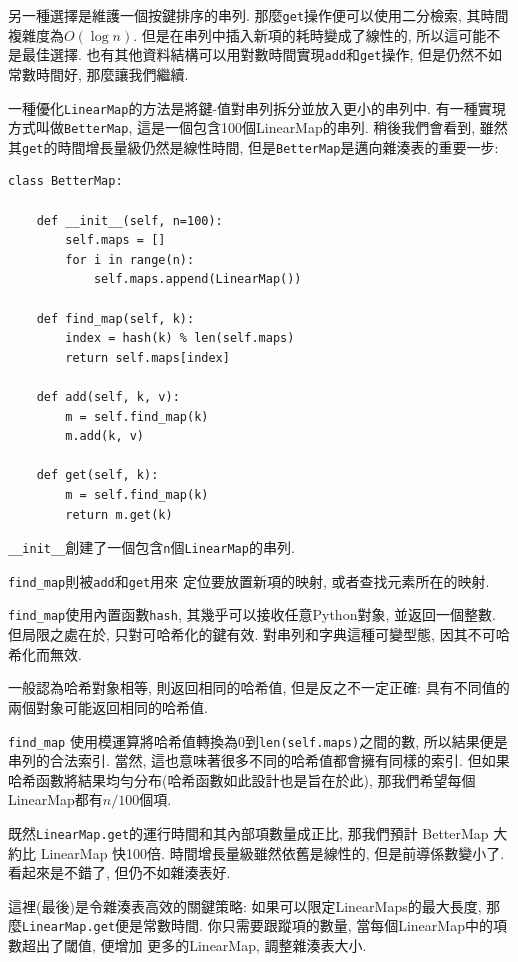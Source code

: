 \documentclass[10pt]{book}
\begin{document}
另一種選擇是維護一個按鍵排序的串列.
那麼{\tt get}操作便可以使用二分檢索, 其時間複雜度為$O(\log n)$.
但是在串列中插入新項的耗時變成了線性的,
所以這可能不是最佳選擇.
也有其他資料結構可以用對數時間實現{\tt add}和{\tt get}操作,
但是仍然不如常數時間好, 那麼讓我們繼續.

一種優化{\tt LinearMap}的方法是將鍵-值對串列拆分並放入更小的串列中. 
有一種實現方式叫做{\tt BetterMap}, 這是一個包含100個LinearMap的串列.
稍後我們會看到, 雖然其{\tt get}的時間增長量級仍然是線性時間,
但是{\tt BetterMap}是邁向雜湊表的重要一步:

\begin{verbatim}
class BetterMap:

    def __init__(self, n=100):
        self.maps = []
        for i in range(n):
            self.maps.append(LinearMap())

    def find_map(self, k):
        index = hash(k) % len(self.maps)
        return self.maps[index]

    def add(self, k, v):
        m = self.find_map(k)
        m.add(k, v)

    def get(self, k):
        m = self.find_map(k)
        return m.get(k)
\end{verbatim}

\verb"__init__"創建了一個包含{\tt n}個{\tt LinearMap}的串列.

\verb"find_map"則被{\tt add}和{\tt get}用來
定位要放置新項的映射, 或者查找元素所在的映射.

\verb"find_map"使用內置函數{\tt hash}, 其幾乎可以接收任意Python對象, 
並返回一個整數.
但局限之處在於, 只對可哈希化的鍵有效. 對串列和字典這種可變型態, 因其不可哈希化而無效.

一般認為哈希對象相等, 則返回相同的哈希值,
但是反之不一定正確: 具有不同值的兩個對象可能返回相同的哈希值.

\verb"find_map" 使用模運算將哈希值轉換為0到{\tt len(self.maps)}之間的數, 
所以結果便是串列的合法索引.
當然, 這也意味著很多不同的哈希值都會擁有同樣的索引. 
但如果哈希函數將結果均勻分布(哈希函數如此設計也是旨在於此), 
那我們希望每個LinearMap都有$n/100$個項. 

既然{\tt LinearMap.get}的運行時間和其內部項數量成正比, 
那我們預計 BetterMap 大約比 LinearMap 快100倍. 
時間增長量級雖然依舊是線性的, 但是前導係數變小了. 
看起來是不錯了, 但仍不如雜湊表好. 

這裡(最後)是令雜湊表高效的關鍵策略:
如果可以限定LinearMaps的最大長度, 那麼{\tt LinearMap.get}便是常數時間.
你只需要跟蹤項的數量, 當每個LinearMap中的項數超出了閾值, 便增加
更多的LinearMap, 調整雜湊表大小. 
\end{document}
